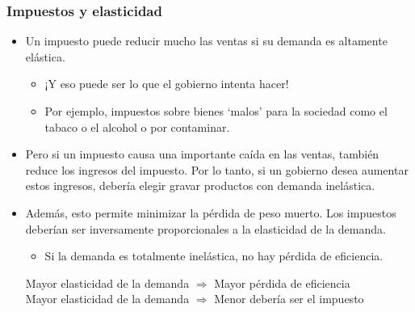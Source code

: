\documentclass{beamer}
\begin{document}
\begin{frame}
\frametitle{Impuestos y elasticidad}
\begin{itemize}
    \item Un impuesto puede reducir mucho las ventas si su demanda es altamente elástica.
    \begin{itemize}
        \item ¡Y eso puede ser lo que el gobierno intenta hacer!
        \item Por ejemplo, impuestos sobre bienes ‘malos’ para la sociedad como el tabaco o el alcohol o por contaminar.
    \end{itemize}
    \vspace{1mm}
    \item Pero si un impuesto causa una importante caída en las ventas, también reduce los ingresos del impuesto. Por lo tanto, si un gobierno desea aumentar estos ingresos, debería elegir gravar productos con demanda inelástica. 
    \vspace{1mm}
    \item Además, esto permite minimizar la pérdida de peso muerto. Los impuestos deberían ser inversamente proporcionales a la elasticidad de la demanda.
        \begin{itemize}
        \item Si la demanda es totalmente inelástica, no hay pérdida de eficiencia. 
        \end{itemize}
    \begin{boxB}
    \centering
    \small
    Mayor elasticidad de la demanda $\Longrightarrow$ Mayor pérdida de eficiencia \\
    Mayor elasticidad de la demanda $\Longrightarrow$ Menor debería ser el impuesto
    \end{boxB}
\end{itemize}
\end{frame}
\end{document}
